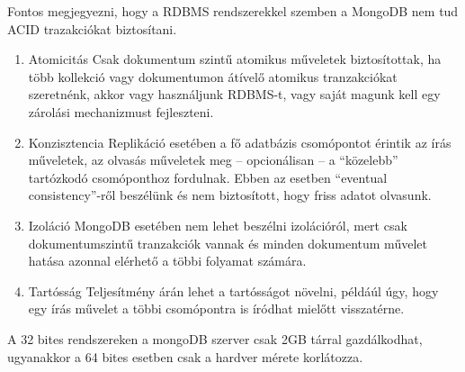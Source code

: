 Fontos megjegyezni, hogy a RDBMS rendszerekkel szemben a MongoDB nem tud ACID trazakciókat biztosítani\cite{acidref}. 
\begin{enumerate}
\item{Atomicitás} Csak dokumentum szintű atomikus műveletek biztosítottak, ha több kollekció vagy dokumentumon átívelő atomikus tranzakciókat szeretnénk, akkor vagy használjunk RDBMS-t, vagy saját magunk kell egy zárolási mechanizmust fejleszteni.
\item{Konzisztencia} Replikáció esetében a fő adatbázis csomópontot érintik az írás műveletek, az olvasás műveletek meg -- opcionálisan --  a ``közelebb'' tartózkodó csomóponthoz fordulnak. Ebben az esetben ``eventual consistency''-ről beszélünk és nem biztosított, hogy friss adatot olvasunk.  
\item{Izoláció} MongoDB esetében nem lehet beszélni izolációról, mert csak dokumentumszintű tranzakciók vannak és minden dokumentum művelet hatása azonnal elérhető a többi folyamat számára. 
\item{Tartósság} Teljesítmény árán lehet a tartósságot növelni, példáúl úgy, hogy egy írás művelet a többi csomópontra is íródhat mielőtt visszatérne.
\end{enumerate}


A 32 bites rendszereken a mongoDB szerver csak 2GB tárral gazdálkodhat, ugyanakkor a 64 bites esetben csak a hardver mérete korlátozza.





